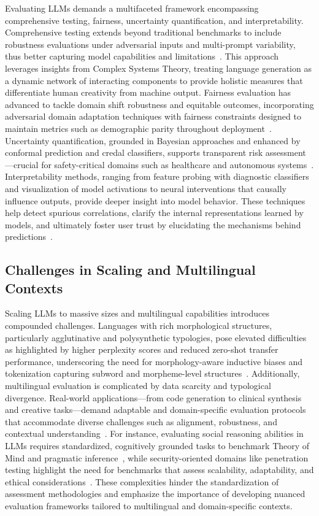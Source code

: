 \documentclass[sigconf]{acmart}
\begin{document}
Evaluating LLMs demands a multifaceted framework encompassing comprehensive testing, fairness, uncertainty quantification, and interpretability. Comprehensive testing extends beyond traditional benchmarks to include robustness evaluations under adversarial inputs and multi-prompt variability, thus better capturing model capabilities and limitations~\cite{ref25}. This approach leverages insights from Complex Systems Theory, treating language generation as a dynamic network of interacting components to provide holistic measures that differentiate human creativity from machine output. Fairness evaluation has advanced to tackle domain shift robustness and equitable outcomes, incorporating adversarial domain adaptation techniques with fairness constraints designed to maintain metrics such as demographic parity throughout deployment~\cite{ref41}. Uncertainty quantification, grounded in Bayesian approaches and enhanced by conformal prediction and credal classifiers, supports transparent risk assessment—crucial for safety-critical domains such as healthcare and autonomous systems~\cite{ref35}. Interpretability methods, ranging from feature probing with diagnostic classifiers and visualization of model activations to neural interventions that causally influence outputs, provide deeper insight into model behavior. These techniques help detect spurious correlations, clarify the internal representations learned by models, and ultimately foster user trust by elucidating the mechanisms behind predictions~\cite{ref36}.

\subsection{Challenges in Scaling and Multilingual Contexts}

Scaling LLMs to massive sizes and multilingual capabilities introduces compounded challenges. Languages with rich morphological structures, particularly agglutinative and polysynthetic typologies, pose elevated difficulties as highlighted by higher perplexity scores and reduced zero-shot transfer performance, underscoring the need for morphology-aware inductive biases and tokenization capturing subword and morpheme-level structures~\cite{ref38}. Additionally, multilingual evaluation is complicated by data scarcity and typological divergence. Real-world applications—from code generation to clinical synthesis and creative tasks—demand adaptable and domain-specific evaluation protocols that accommodate diverse challenges such as alignment, robustness, and contextual understanding~\cite{ref12,ref15,ref31}. For instance, evaluating social reasoning abilities in LLMs requires standardized, cognitively grounded tasks to benchmark Theory of Mind and pragmatic inference~\cite{ref15}, while security-oriented domains like penetration testing highlight the need for benchmarks that assess scalability, adaptability, and ethical considerations~\cite{ref31}. These complexities hinder the standardization of assessment methodologies and emphasize the importance of developing nuanced evaluation frameworks tailored to multilingual and domain-specific contexts.
\end{document}
